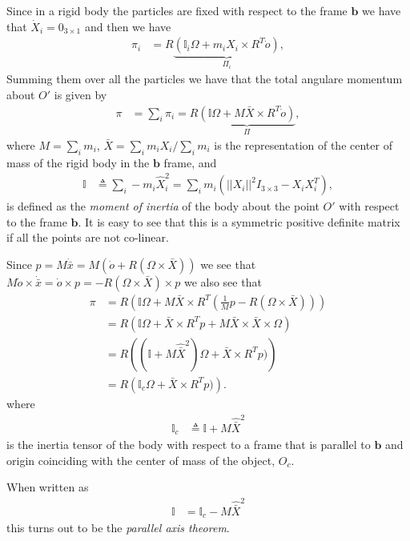 \documentclass[graybox,envcountchap,sectrefs]{svmonoMuga}
\begin{document}
Since in a rigid body the particles are fixed with respect to the frame $\mathbf{b}$ we have that $\dot{X}_i=0_{3\times 1}$ and then we have
\begin{align}
\pi_i&= R\underbrace{\left(\mathbb{I}_i\Omega+m_iX_i\times R^T\dot{o}\right)}_{\Pi_i},
\end{align}
Summing them over all the particles we have that the total angulare momentum about $O'$ is given by
\begin{align}
\pi&=\sum_{i}\pi_i= R\underbrace{\left(\mathbb{I}\Omega+M\bar{X}\times R^T\dot{o}\right)}_{\Pi},
\end{align}
where $M=\sum_{i}m_i$, $\bar{X}=\sum_{i}m_i X_i/\sum_{i}m_i$ is the representation of the center of mass of the rigid body in the $\mathbf{b}$ frame, and
\begin{align}
\mathbb{I} &\triangleq \sum_{i}-m_i\widehat{X}_i^2=\sum_{i}m_i\left(||X_i||^2I_{3\times 3} - X_iX_i^T\right),
\end{align} 
is defined as the \textit{moment of inertia} of the body about the point $O'$ with respect to the frame $\mathbf{b}$. It is easy to see that this is a symmetric positive definite matrix if all the points are not co-linear.

Since $p=M\dot{\bar{x}}=M(\dot{o}+R(\Omega\times \bar{X}))$ we see that $M\dot{o}\times \dot{\bar{x}}=\dot{o}\times p=-R(\Omega \times \bar{X})\times p$ we also see that
\begin{align}
\pi&=R\left(\mathbb{I}\Omega +M\bar{X}\times R^T\left(\frac{1}{M}p-R(\Omega\times \bar{X})\right)\right)\\
&=R\left(\mathbb{I}\Omega +\bar{X}\times R^Tp+M\bar{X}\times \bar{X} \times\Omega\right)\\
&=R\left((\mathbb{I}+M\widehat{\bar{X}}^2)\Omega +\bar{X}\times R^Tp)\right)\\
&=R\left(\mathbb{I}_c\Omega +\bar{X}\times R^Tp)\right).
\end{align}
where 
\begin{align*}
\mathbb{I}_c&\triangleq \mathbb{I}+M\widehat{\bar{X}}^2
\end{align*} 
is the inertia tensor of the body with respect to a frame that is parallel to $\mathbf{b}$ and origin coinciding with the center of mass of the object, $O_c$.



When written as 
\begin{align}
\mathbb{I}&=\mathbb{I}_c-M\widehat{\bar{X}}^2
\end{align} 
this turns out to be the \textit{parallel axis theorem}. 
\end{document}
